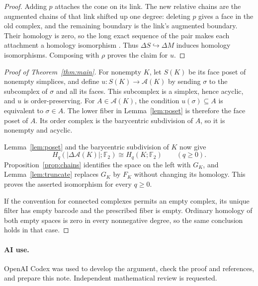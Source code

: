 \documentclass[11pt,a4paper]{article}
\newcommand{\F}{\mathbb F_2}
\newcommand{\A}{\mathcal A}
\begin{document}
\begin{proof}
Adding $p$ attaches the cone on its link. The new relative chains are the
augmented chains of that link shifted up one degree: deleting $p$ gives
a face in the old complex, and the remaining boundary is the link's
augmented boundary. Their homology is zero, so the long exact sequence of
the pair makes each attachment a homology isomorphism
\cite[Theorem~2.16 and pp.~117--118, 153]{Hatcher}. Thus
$\Delta S\hookrightarrow\Delta M$ induces homology isomorphisms.
Composing with $\rho$ proves the claim for $u$.
\end{proof}

\begin{proof}[Proof of Theorem~\ref{thm:main}]
For nonempty $K$, let $S(K)$ be its face poset of nonempty simplices, and
define $u:S(K)\to\A(K)$ by sending $\sigma$ to the subcomplex of $\sigma$
and all its faces. This subcomplex is a simplex, hence acyclic, and $u$ is
order-preserving. For $A\in\A(K)$, the condition $u(\sigma)\subseteq A$
is equivalent to $\sigma\in A$. The lower fiber in Lemma~\ref{lem:poset}
is therefore the face poset of $A$. Its order complex is the barycentric
subdivision of $A$, so it is nonempty and acyclic.

Lemma~\ref{lem:poset} and the barycentric subdivision of $K$ now give
\[
 H_q(|\Delta\A(K)|;\F)\cong H_q(K;\F)
 \qquad(q\geq0).
\]
Proposition~\ref{prop:chains} identifies the space on the left with $G_K$,
and Lemma~\ref{lem:truncate} replaces $G_K$ by $F_K$ without changing its
homology. This proves the asserted isomorphism for every $q\geq0$.

If the convention for connected complexes permits an empty complex, its
unique filter has empty barcode and the prescribed fiber is empty. Ordinary
homology of both empty spaces is zero in every nonnegative degree, so the
same conclusion holds in that case.
\end{proof}

\paragraph{AI use.}
OpenAI Codex was used to develop the argument, check the proof and references,
and prepare this note. Independent mathematical review is requested.
\end{document}
